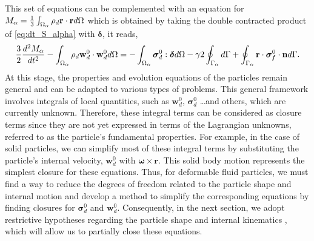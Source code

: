 This set of equations can be complemented with an equation for $M_\alpha = \frac{1}{3}\int_{\Omega_{\alpha}} \rho_d \textbf{r}\cdot \textbf{r} d\Omega$ which is obtained by taking the double contracted product of \ref{eq:dt_S_alpha} with $\bm\delta$,
it reads, 
\begin{equation}
    \frac{3}{2}\frac{d^2 M_\alpha}{dt^2}
    - \intO{ \rho_d \textbf{w}_d^0 \cdot \textbf{w}_d^0}
    = 
    - \intO{\bm\sigma_d^0:\bm\delta} 
    - \gamma 2 \intS{}
    + \intS{\textbf{r}\cdot\bm\sigma_f^0\cdot \textbf{n}}.
    \label{eq:dt_D_alpha}
\end{equation}
At this stage, the properties and evolution equations of the particles remain general and can be adapted to various types of problems. 
This general framework involves integrals of local quantities, such as $\textbf{w}_d^0$, $\bm\sigma_d^0$ \ldots and others, which are currently unknown. 
Therefore, these integral terms can be considered as closure terms since they are not yet expressed in terms of the Lagrangian unknowns, referred to as the particle's fundamental properties.
For example, in the case of solid particles, we can simplify most of these integral terms by substituting the particle's internal velocity, $\textbf{w}_d^0$ with $ \bm\omega \times \textbf{r}$. 
This solid body motion represents the simplest closure for these equations.  
Thus, for deformable fluid particles, we must find a way to reduce the degrees of freedom related to the particle shape and internal motion and develop a method to simplify the corresponding equations by finding closures for $\bm\sigma_d^0$ and $\textbf{w}_d^0$.
Consequently, in the next section, we adopt restrictive hypotheses regarding the particle shape and internal kinematics  , which will allow us to partially close these equations.
